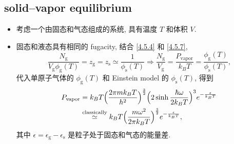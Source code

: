 \subsection{solid--vapor equilibrium}
\begin{itemize}
	\item 考虑一个由固态和气态组成的系统, 具有温度 $T$ 和体积 $V$.
	
	\item 固态和液态具有相同的 fugacity, 结合 \eqref{4.5.4} 和 \eqref{4.5.7},
	\begin{equation}
		\frac{N_\text{g}}{V_\text{g} \phi_\text{g}(T)} = z_\text{g} = z_\text{s} \simeq \frac{1}{\phi_\text{s}(T)} \Longrightarrow \frac{N_\text{g}}{V_\text{g}} = \frac{P_\text{vapor}}{k_B T} = \frac{\phi_\text{g}(T)}{\phi_\text{s}(T)},
	\end{equation}
	代入单原子气体的 $\phi_\text{g}(T)$ 和 Einstein model 的 $\phi_\text{s}(T)$, 得到
	\begin{align}
		P_\text{vapor} &= k_B T \Big( \frac{2 \pi m k_B T}{h^2} \Big)^{\frac{3}{2}} \Big( 2 \sinh \frac{\hbar \omega}{2 k_B T} \Big)^3 e^{- \frac{\epsilon}{k_B T}} \notag \\
		&\overset{\text{classically}}{\simeq} k_B T \Big( \frac{m \omega^2}{2 \pi k_B T} \Big)^{\frac{3}{2}} e^{- \frac{\epsilon}{k_B T}},
	\end{align}
	其中 $\epsilon = \epsilon_\text{g} - \epsilon_\text{s}$ 是粒子处于固态和气态的能量差.
\end{itemize}

